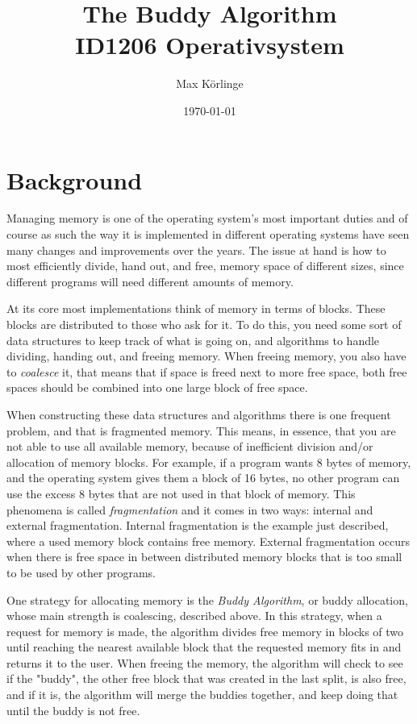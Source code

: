 \documentclass{article}
\begin{document}
\title{\vspace{-3.3cm}The Buddy Algorithm \\
\medskip
\large
ID1206 Operativsystem }
\author{Max Körlinge}
\date{\today}
\maketitle


\section{Background}

Managing memory is one of the operating system's most important duties and of course as such the way it is implemented in different operating systems have seen many changes and improvements over the years. The issue at hand is how to most efficiently divide, hand out, and free, memory space of different sizes, since different programs will need different amounts of memory.

At its core most implementations think of memory in terms of blocks. These blocks are distributed to those who ask for it. To do this, you need some sort of data structures to keep track of what is going on, and algorithms to handle dividing, handing out, and freeing memory. When freeing memory, you also have to \textit{coalesce} it, that means that if space is freed next to more free space, both free spaces should be combined into one large block of free space.

When constructing these data structures and algorithms there is one frequent problem, and that is fragmented memory. This means, in essence, that you are not able to use all available memory, because of inefficient division and/or allocation of memory blocks. For example, if a program wants 8 bytes of memory, and the operating system gives them a block of 16 bytes, no other program can use the excess 8 bytes that are not used in that block of memory. This phenomena is called \textit{fragmentation} and it comes in two ways: internal and external fragmentation. Internal fragmentation is the example just described, where a used memory block contains free memory. External fragmentation occurs when there is free space in between distributed memory blocks that is too small to be used by other programs.

One strategy for allocating memory is the \textit{Buddy Algorithm}, or buddy allocation, whose main strength is coalescing, described above. In this strategy, when a request for memory is made, the algorithm divides free memory in blocks of two until reaching the nearest available block that the requested memory fits in and returns it to the user. When freeing the memory, the algorithm will check to see if the "buddy", the other free block that was created in the last split, is also free, and if it is, the algorithm will merge the buddies together, and keep doing that until the buddy is not free.
\end{document}
